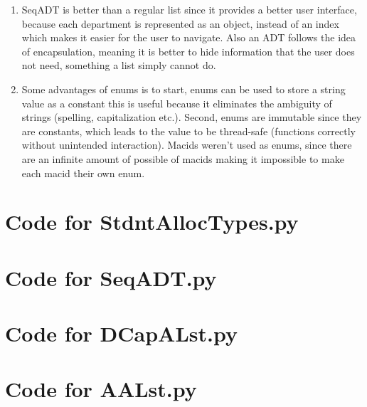 \documentclass[12pt]{article}
\begin{document}
\begin{enumerate}
\item SeqADT is better than a regular list since it provides a better user interface, because each department is represented as an object, instead of an index which makes it easier for the user to navigate. Also an ADT follows the idea of encapsulation, meaning it is better to hide information that the user does not need, something a list simply cannot do.
\item Some advantages of enums is to start, enums can be used to store a string value as a constant this is useful because it eliminates the ambiguity of strings (spelling, capitalization etc.). Second, enums are immutable since they are constants, which leads to the value to be thread-safe (functions correctly without unintended interaction). Macids weren't used as enums, since there are an infinite amount of possible of macids making it impossible to make each macid their own enum.

\end{enumerate}

\newpage

\lstset{language=Python, basicstyle=\tiny, breaklines=true, showspaces=false,
  showstringspaces=false, breakatwhitespace=true}

\def\thesection{\Alph{section}}

\section{Code for StdntAllocTypes.py}

\noindent 

\newpage

\section{Code for SeqADT.py}

\noindent 

\newpage

\section{Code for DCapALst.py}

\noindent 

\newpage

\section{Code for AALst.py}
\end{document}
